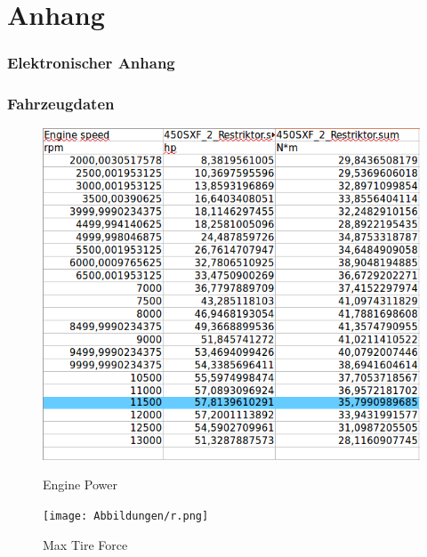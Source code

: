 

\renewcommand{\thefigure}{A\arabic{figure}} 
\chapter{Anhang}

\subsection*{Elektronischer Anhang }

\subsection*{Fahrzeugdaten}
\begin{figure}[hb!]
	\caption{Engine Power}
	\includegraphics[width=350pt]{Abbildungen/Engine_power.png}
	\label{fig:enginePower}
\end{figure}

\begin{figure}[hb!]
	\caption{Max Tire Force}
	\texttt{[image: Abbildungen/r.png]}
	\label{fig:maxTireForce}
\end{figure}



